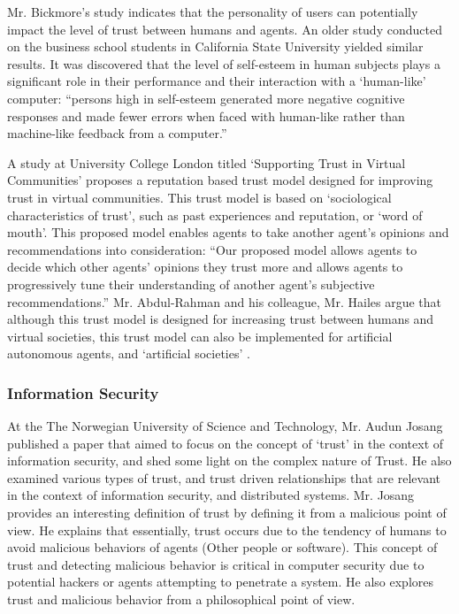 \documentclass[runningheads,a4paper]{llncs}
\begin{document}
Mr. Bickmore's study indicates that the personality of users can potentially impact the level of trust between humans and agents. An older study conducted on the business school students in California State University yielded similar results. It was discovered that the level of self-esteem in human subjects plays a significant role in their performance and their interaction with a `human-like' computer: ``persons high in self-esteem generated more negative cognitive responses and made fewer errors when faced with human-like rather than machine-like feedback from a computer.'' \cite{resnik1985influence}

A study at University College London titled `Supporting Trust in Virtual Communities' proposes a reputation based trust model designed for improving trust in virtual communities. This trust model is based on `sociological characteristics of trust', such as past experiences and reputation, or `word of mouth'. This proposed model enables agents to take another agent's opinions and recommendations into consideration: ``Our
proposed model allows agents to decide which other
agents’ opinions they trust more and allows agents to
progressively tune their understanding of another agent’s
subjective recommendations.''  Mr. Abdul-Rahman and his colleague, Mr. Hailes argue that although this trust model is designed for increasing trust between humans and virtual societies, this trust model can also be implemented for artificial autonomous agents, and `artificial societies' \cite{abdul2000supporting}.


\subsubsection{Information Security}
At the The Norwegian University of Science and Technology, Mr. Audun Josang published a paper that aimed to focus on the concept of `trust' in the context of information security, and shed some light on the complex nature of Trust. He also examined various types of trust, and trust driven relationships that are relevant in the context of information security, and distributed systems. Mr. Josang provides an interesting definition of trust by defining it from a malicious point of view. He explains that essentially, trust occurs due to the tendency of humans to avoid malicious behaviors of agents (Other people or software). This concept of trust and detecting malicious behavior is critical in computer security due to potential hackers or agents attempting to penetrate a system. He also explores trust and malicious behavior from a philosophical point of view. \cite{josang1998modelling}
\end{document}
